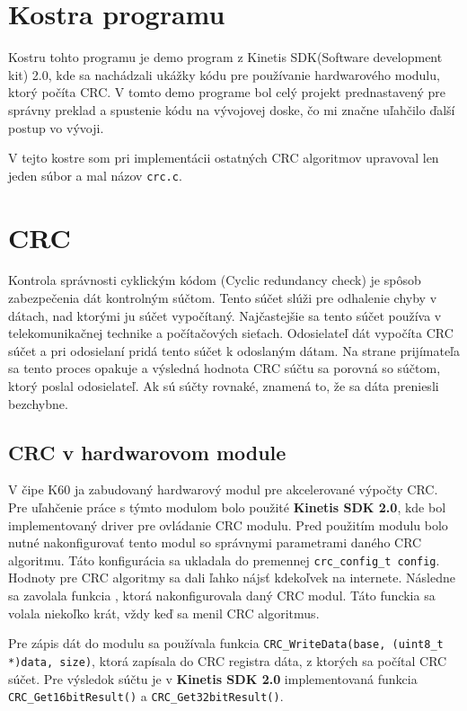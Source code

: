 \documentclass[a4paper, 11pt]{article}
\begin{document}
\section{Kostra programu}
Kostru tohto programu je demo program z Kinetis SDK(Software development kit) 2.0, kde sa nachádzali ukážky kódu pre používanie hardwarového modulu, ktorý počíta CRC. V tomto demo programe bol celý projekt prednastavený pre správny preklad a spustenie kódu na vývojovej doske, čo mi značne uľahčilo ďalší postup vo vývoji.

V tejto kostre som pri implementácii ostatných CRC algoritmov upravoval len jeden súbor a mal názov {\tt crc.c}.

\section{CRC}

Kontrola správnosti cyklickým kódom (Cyclic redundancy check) je spôsob zabezpečenia dát kontrolným súčtom. Tento súčet slúži pre odhalenie chyby v dátach, nad ktorými ju súčet vypočítaný. Najčastejšie sa tento súčet používa v telekomunikačnej technike a počítačových sieťach. Odosielateľ dát vypočíta CRC súčet a pri odosielaní pridá tento súčet k odoslaným dátam. Na strane prijímateľa sa tento proces opakuje a výsledná hodnota CRC súčtu sa porovná so súčtom, ktorý poslal odosielateľ. Ak sú súčty rovnaké, znamená to, že sa dáta preniesli bezchybne. 

\subsection{CRC v hardwarovom module}

V čipe K60 ja zabudovaný hardwarový modul pre akcelerované výpočty CRC. Pre uľahčenie práce s týmto modulom bolo použité \textbf{Kinetis SDK 2.0}, kde bol implementovaný driver pre ovládanie CRC modulu. Pred použitím modulu bolo nutné nakonfigurovať tento modul so správnymi parametrami daného CRC algoritmu. Táto konfigurácia sa ukladala do premennej {\tt crc\_config\_t config}. Hodnoty pre CRC algoritmy sa dali ľahko nájsť kdekoľvek na internete. Následne sa zavolala funkcia , ktorá nakonfigurovala daný CRC modul. Táto funckia sa volala niekoľko krát, vždy keď sa menil CRC algoritmus.

Pre zápis dát do modulu sa používala funkcia {\tt CRC\_WriteData(base, (uint8\_t *)data, size)}, ktorá zapísala do CRC registra dáta, z ktorých sa počítal CRC súčet. Pre výsledok súčtu je v \textbf{ Kinetis SDK 2.0} implementovaná funkcia {\tt  CRC\_Get16bitResult()} a {\tt CRC\_Get32bitResult()}.
\end{document}
